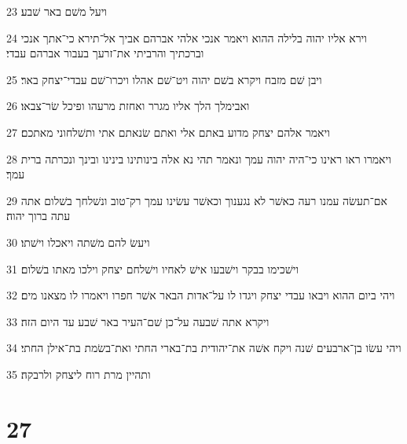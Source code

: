 \par 23 ויעל משׁם באר שׁבע׃
\par 24 וירא אליו יהוה בלילה ההוא ויאמר אנכי אלהי אברהם אביך אל־תירא כי־אתך אנכי וברכתיך והרביתי את־זרעך בעבור אברהם עבדי׃
\par 25 ויבן שׁם מזבח ויקרא בשׁם יהוה ויט־שׁם אהלו ויכרו־שׁם עבדי־יצחק באר׃
\par 26 ואבימלך הלך אליו מגרר ואחזת מרעהו ופיכל שׂר־צבאו׃
\par 27 ויאמר אלהם יצחק מדוע באתם אלי ואתם שׂנאתם אתי ותשׁלחוני מאתכם׃
\par 28 ויאמרו ראו ראינו כי־היה יהוה עמך ונאמר תהי נא אלה בינותינו בינינו ובינך ונכרתה ברית עמך׃
\par 29 אם־תעשׂה עמנו רעה כאשׁר לא נגענוך וכאשׁר עשׂינו עמך רק־טוב ונשׁלחך בשׁלום אתה עתה ברוך יהוה׃
\par 30 ויעשׂ להם משׁתה ויאכלו וישׁתו׃
\par 31 וישׁכימו בבקר וישׁבעו אישׁ לאחיו וישׁלחם יצחק וילכו מאתו בשׁלום׃
\par 32 ויהי ביום ההוא ויבאו עבדי יצחק ויגדו לו על־אדות הבאר אשׁר חפרו ויאמרו לו מצאנו מים׃
\par 33 ויקרא אתה שׁבעה על־כן שׁם־העיר באר שׁבע עד היום הזה׃
\par 34 ויהי עשׂו בן־ארבעים שׁנה ויקח אשׁה את־יהודית בת־בארי החתי ואת־בשׂמת בת־אילן החתי׃
\par 35 ותהיין מרת רוח ליצחק ולרבקה׃

\chapter{27}


